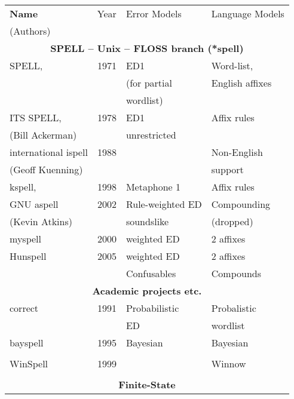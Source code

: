 \documentclass[officiallayout,final]{unihelcompling}
\begin{document}
\begin{longtable}[ht]{|l|r|l|l|}
        \hline
        \bf Name & Year & Error Models & Language Models \\
(Authors)        &      &              & \\
        \hline
        \multicolumn{4}{|c|}{\bf SPELL -- Unix -- FLOSS branch (*spell) }\\
        \hline
             SPELL,            & 1971 & ED1          & Word-list,    \\
        \citep{gorin1971spell} &      & (for partial & English affixes \\
                               &      &  wordlist)  &              \\
        ITS SPELL,             & 1978 & ED1          & Affix rules \\
     (Bill Ackerman)           &      & unrestricted &  \\
        international ispell   & 1988 &              & Non-English \\
              (Geoff Kuenning) &      &              & support \\
        \hline
        kspell,                & 1998 & Metaphone 1 & Affix rules \\
        GNU aspell             & 2002 & Rule-weighted ED & Compounding \\
    (Kevin Atkins)             &      & soundslike & (dropped)  \\
        \hline
        myspell & 2000 & weighted ED & 2 affixes \\
        \hline
        Hunspell & 2005 & weighted ED & 2 affixes  \\
                 &      & Confusables & Compounds  \\
        \hline
        \multicolumn{4}{|c|}{\bf Academic projects etc.} \\
        \hline
        correct & 1991 & Probabilistic & Probalistic \\
        \citep{church1991probability} & & ED & wordlist \\
        \hline
        bayspell  & 1995 & Bayesian & Bayesian \\
        \citep{golding1995bayesian} & & & \\
        \hline
        WinSpell & 1999 & & Winnow \\
        \citep{golding1999winnow} & & & \\
        \hline
        \multicolumn{4}{|c|}{\bf Finite-State} \\

\end{longtable}
\end{document}
